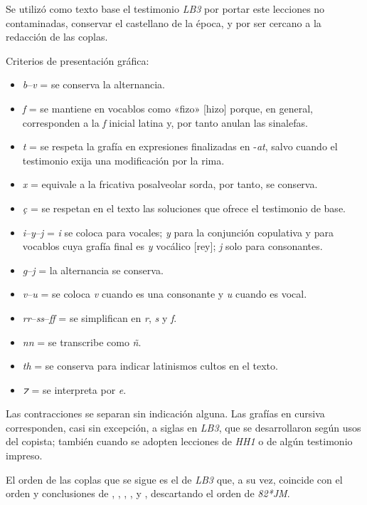 \documentclass[11pt,a4paper,twoside]{article}
\newcommand{\comillas}[1]{«#1»}
\newcommand{\eg}{{\emph{LB3}}}
\newcommand{\jm}{\emph{82*JM}}
\newcommand{\hh}{\emph{HH1}}
\begin{document}
Se utilizó como texto base el testimonio {\eg} por portar este lecciones no contaminadas, conservar el castellano de la época, y por ser cercano a la redacción de las coplas.\par
%
Criterios de presentación gráfica:
%
\begin{itemize}[label=--]%
\item \emph{b}--\emph{v} = se conserva la alternancia.
\item \emph{f} = se mantiene en vocablos como \comillas{fizo} [hizo] porque, en general, corresponden a la \emph{f} inicial latina y, por tanto anulan las sinalefas.
\item \emph{t} = se respeta la grafía en expresiones finalizadas en -\emph{at}, salvo cuando el testimonio exija una modificación por la rima.
\item \emph{x} = equivale a la fricativa posalveolar sorda, por tanto, se conserva.
\item \emph{ç} = se respetan en el texto las soluciones que ofrece el testimonio de base.
\item \emph{i}--\emph{y}--\emph{j} = \emph{i} se coloca para vocales; \emph{y} para la conjunción copulativa y para vocablos cuya grafía final es \emph{y} vocálico [rey]; \emph{j} solo para consonantes.
\item \emph{g}--\emph{j} = la alternancia se conserva.
\item \emph{v}--\emph{u} = se coloca \emph{v} cuando es una consonante y \emph{u} cuando es vocal.
\item \emph{rr}--\emph{ss}--\emph{ff} = se simplifican en \emph{r}, \emph{s} y \emph{f}.
\item \emph{nn} = se transcribe como \emph{ñ}.
\item \emph{th} = se conserva para indicar latinismos cultos en el texto.
\item \emph{⁊} = se interpreta por \emph{e}.%
\end{itemize}\par
%
Las contracciones se separan sin indicación alguna. Las grafías en cursiva corresponden, casi sin excepción, a siglas en {\eg}, que se desarrollaron según usos del copista; también cuando se adopten lecciones de {\hh} o de algún testimonio impreso.\par
%
El orden de las coplas que se sigue es el de {\eg} que, a su vez, coincide con el orden y conclusiones de \textcite{Senabre1983}, \textcite{Palumbo1983}, \textcite{Orduna1967}, \textcite{Beltrán1991,Beltrán2013}, \textcite{PérezPriego1990,PérezPriego2017} y \parencite{Foulché-Delbosc1902}, descartando el orden de {\jm}.\par
\end{document}
